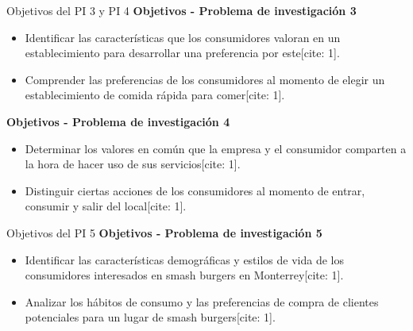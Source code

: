 \begin{frame}{Objetivos del PI 3 y PI 4}
  \vspace{1.5cm}
  \textbf{Objetivos - Problema de investigación 3}
  \begin{itemize}
    \item Identificar las características que los consumidores valoran en un establecimiento para desarrollar una preferencia por este[cite: 1].
    \item Comprender las preferencias de los consumidores al momento de elegir un establecimiento de comida rápida para comer[cite: 1].
  \end{itemize}

  \vspace{0.5cm}
  \textbf{Objetivos - Problema de investigación 4}
  \begin{itemize}
    \item Determinar los valores en común que la empresa y el consumidor comparten a la hora de hacer uso de sus servicios[cite: 1].
    \item Distinguir ciertas acciones de los consumidores al momento de entrar, consumir y salir del local[cite: 1].
  \end{itemize}
\end{frame}

\begin{frame}{Objetivos del PI 5}
  \vspace{1.5cm}
  \textbf{Objetivos - Problema de investigación 5}
  \begin{itemize}
    \item Identificar las características demográficas y estilos de vida de los consumidores interesados en smash burgers en Monterrey[cite: 1].
    \item Analizar los hábitos de consumo y las preferencias de compra de clientes potenciales para un lugar de smash burgers[cite: 1].
  \end{itemize}
\end{frame}
